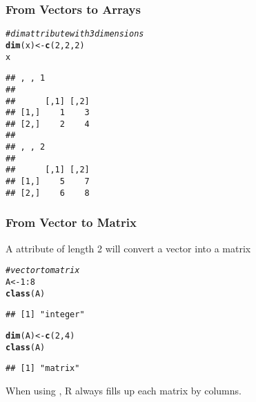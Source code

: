 \documentclass[12pt]{beamer}\usepackage[]{graphicx}\usepackage[]{color}
\makeatletter
\newcommand{\hlnum}[1]{\textcolor[rgb]{0.686,0.059,0.569}{#1}}%
\newcommand{\hlcom}[1]{\textcolor[rgb]{0.678,0.584,0.686}{\textit{#1}}}%
\newcommand{\hlopt}[1]{\textcolor[rgb]{0,0,0}{#1}}%
\newcommand{\hlstd}[1]{\textcolor[rgb]{0.345,0.345,0.345}{#1}}%
\newcommand{\hlkwb}[1]{\textcolor[rgb]{0.69,0.353,0.396}{#1}}%
\newcommand{\hlkwd}[1]{\textcolor[rgb]{0.737,0.353,0.396}{\textbf{#1}}}%
\newenvironment{kframe}{%
 \def\at@end@of@kframe{}%
 \ifinner\ifhmode%
  \def\at@end@of@kframe{\end{minipage}}%
  \begin{minipage}{\columnwidth}%
 \fi\fi%
 \def\FrameCommand##1{\hskip\@totalleftmargin \hskip-\fboxsep
 \colorbox{shadecolor}{##1}\hskip-\fboxsep
     \hskip-\linewidth \hskip-\@totalleftmargin \hskip\columnwidth}%
 \MakeFramed {\advance\hsize-\width
   \@totalleftmargin\z@ \linewidth\hsize
   \@setminipage}}%
 {\par\unskip\endMakeFramed%
 \at@end@of@kframe}
\newenvironment{knitrout}{}{} %
\makeatother
\begin{document}
\begin{frame}[fragile]
\frametitle{From Vectors to Arrays}

\begin{knitrout}\footnotesize
{}\color{fgcolor}\begin{kframe}
\begin{alltt}
\hlcom{# dim attribute with 3 dimensions}
\hlkwd{dim}\hlstd{(x)} \hlkwb{<-} \hlkwd{c}\hlstd{(}\hlnum{2}\hlstd{,} \hlnum{2}\hlstd{,} \hlnum{2}\hlstd{)}
\hlstd{x}
\end{alltt}
\begin{verbatim}
## , , 1
## 
##      [,1] [,2]
## [1,]    1    3
## [2,]    2    4
## 
## , , 2
## 
##      [,1] [,2]
## [1,]    5    7
## [2,]    6    8
\end{verbatim}
\end{kframe}
\end{knitrout}

\end{frame}


\begin{frame}[fragile]
\frametitle{From Vector to Matrix}

A  attribute of length 2 will convert a vector into a matrix
\begin{knitrout}\footnotesize
{}\color{fgcolor}\begin{kframe}
\begin{alltt}
\hlcom{# vector to matrix}
\hlstd{A} \hlkwb{<-} \hlnum{1}\hlopt{:}\hlnum{8}
\hlkwd{class}\hlstd{(A)}
\end{alltt}
\begin{verbatim}
## [1] "integer"
\end{verbatim}
\begin{alltt}
\hlkwd{dim}\hlstd{(A)} \hlkwb{<-} \hlkwd{c}\hlstd{(}\hlnum{2}\hlstd{,} \hlnum{4}\hlstd{)}
\hlkwd{class}\hlstd{(A)}
\end{alltt}
\begin{verbatim}
## [1] "matrix"
\end{verbatim}
\end{kframe}
\end{knitrout}

When using , R always fills up each matrix by columns.

\end{frame}
\end{document}
